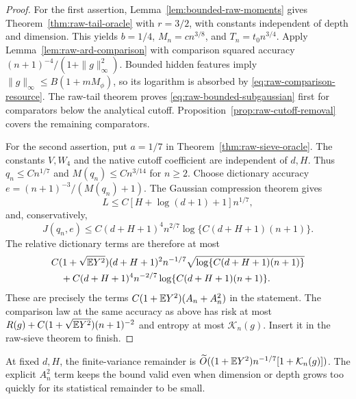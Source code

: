 \begin{proof}
For the first assertion, Lemma~\ref{lem:bounded-raw-moments} gives
Theorem~\ref{thm:raw-tail-oracle} with $r=3/2$, with constants
independent of depth and dimension. This yields $b=1/4$,
$M_n=c n^{3/8}$, and $T_n=t_0n^{3/4}$.
Apply Lemma~\ref{lem:raw-ard-comparison} with comparison squared
accuracy $(n+1)^{-4}/(1+\|g\|_\infty^2)$.
Bounded hidden features imply
$\|g\|_\infty\le B(1+mM_\phi)$, so its logarithm is absorbed by
\eqref{eq:raw-comparison-resource}. The raw-tail theorem proves
\eqref{eq:raw-bounded-subgaussian} first for comparators below the analytical cutoff. Proposition~\ref{prop:raw-cutoff-removal} covers the remaining comparators.

For the second assertion, put $a=1/7$ in
Theorem~\ref{thm:raw-sieve-oracle}. The constants $V,W_4$ and the
native cutoff coefficient are independent of $d,H$. Thus
$q_n\le C n^{1/7}$ and $M(q_n)\le Cn^{3/14}$ for $n\ge2$.
Choose dictionary accuracy $e=(n+1)^{-3}/(M(q_n)+1)$.
The Gaussian compression theorem gives
\[
 L\le C[H+\log(d+1)+1]n^{1/7},
\]
and, conservatively,
\[
 J(q_n,e)\le C(d+H+1)^4 n^{2/7}
                         \log\{C(d+H+1)(n+1)\}.
\]
The relative dictionary terms are therefore at most
\begin{align*}
 &C(1+\sqrt{\mathbb E Y^2})(d+H+1)^2n^{-1/7}\sqrt{\log\{C(d+H+1)(n+1)\}}\\
 &\quad+C(d+H+1)^4n^{-2/7}\log\{C(d+H+1)(n+1)\}.
\end{align*}
These are precisely the terms $C(1+\mathbb E Y^2)(A_n+A_n^2)$ in the statement.
The comparison law at the same accuracy as above has risk at most
$R(g)+C(1+\sqrt{\mathbb E Y^2})(n+1)^{-2}$ and entropy at most
$\mathcal K_n(g)$. Insert it in the raw-sieve theorem to finish.
\end{proof}

At fixed $d,H$, the finite-variance remainder is
$\widetilde O((1+\mathbb E Y^2)n^{-1/7}[1+\mathcal K_n(g)])$.
The explicit $A_n^2$ term keeps the bound valid even when dimension
or depth grows too quickly for its statistical remainder to be small.


